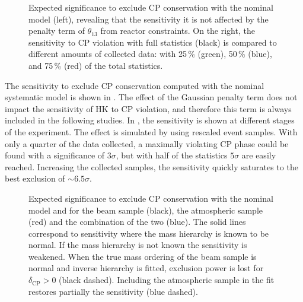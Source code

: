 \begin{figure}
	\centering
	\resizebox{0.49\linewidth}{!}{}
	\resizebox{0.49\linewidth}{!}{}
	\caption[Sensitivity to $\delta_\text{CP}$ with the nominal systematic model]%
		{Expected significance to exclude CP conservation with the nominal model (left), %
		revealing that the sensitivity it is not affected by the penalty term of $\theta_{13}$ %
		from reactor constraints.
		On the right, the sensitivity to CP violation with full statistics (black) is compared %
		to different amounts of collected data: %
		with 25\,\% (green), 50\,\% (blue), and 75\,\% (red) of the total statistics.}
	\label{fig:nominal_sensitivity}
\end{figure}


The sensitivity to exclude CP conservation computed with the nominal systematic model %
is shown in .
The effect of the Gaussian penalty term does not impact the sensitivity of HK to CP violation, and %
therefore this term is always included in the following studies.
In , the sensitivity is shown at different stages of the experiment.
The effect is simulated by using rescaled event samples.
With only a quarter of the data collected, a maximally violating CP phase could be found with a significance of $3\sigma$, %
but with half of the statistics $5\sigma$ are easily reached.
Increasing the collected samples, the sensitivity quickly saturates to the best exclusion of $\sim6.5\sigma$.

\begin{figure}
	\centering
	\resizebox{0.7\linewidth}{!}{}
	\caption[Sensitivity to $\delta_\text{CP}$ with the nominal model and unknown hierarchy]%
		{Expected significance to exclude CP conservation with the nominal model and %
		for the beam sample (black), the atmospheric sample (red) and the combination of the two (blue).
		The solid lines correspond to sensitivity where the mass hierarchy is known to be normal.
		If the mass hierarchy is not known the sensitivity is weakened.
		When the true mass ordering of the beam sample is normal and inverse hierarchy is fitted, %
		exclusion power is lost for $\delta_\text{CP} > 0$ (black dashed).
		Including the atmospheric sample in the fit restores partially the sensitivity (blue dashed).}
	\label{fig:combined_sens}
\end{figure}

